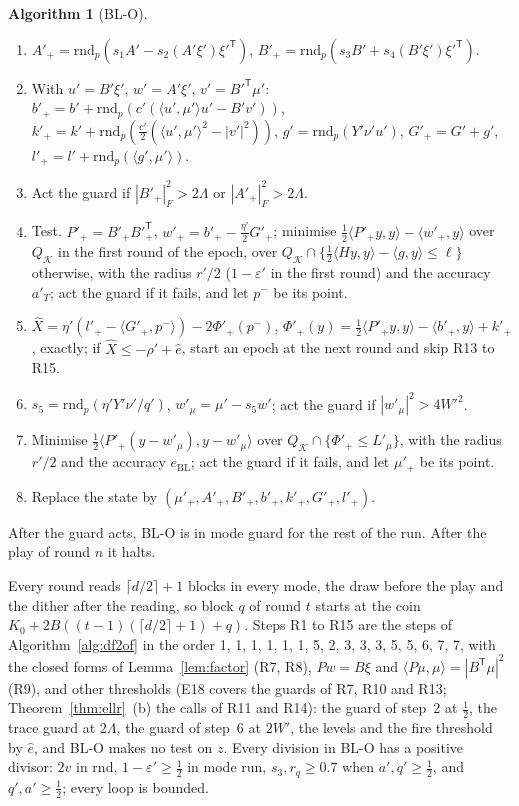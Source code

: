 \documentclass[11pt]{amsart}
\theoremstyle{definition}
\newtheorem{algorithm}[theorem]{Algorithm}
\numberwithin{equation}{section}
\newcommand{\cK}{\mathcal{K}}
\newcommand{\ip}[1]{\langle #1\rangle}
\begin{document}
\begin{algorithm}[BL-O]
\begin{center}
{\begin{minipage}{0.93\textwidth}
\begin{enumerate}[label=R\arabic*.,leftmargin=2.2em]
\item[R8.] $A'_+=\mathrm{rnd}_p(s_1A'-s_2(A'\xi')\xi'^{\mathsf T})$, $B'_+=\mathrm{rnd}_p(s_3B'+s_4(B'\xi')\xi'^{\mathsf T})$.
\item[R9.] With $u'=B'\xi'$, $w'=A'\xi'$, $v'=B'^{\mathsf T}\mu'$: $b'_+=b'+\mathrm{rnd}_p(c'(\ip{u',\mu'}u'-B'v'))$, $k'_+=k'+\mathrm{rnd}_p(\frac{c'}2(\ip{u',\mu'}^2-|v'|^2))$, $g'=\mathrm{rnd}_p(Y'\nu'u')$, $G'_+=G'+g'$, $l'_+=l'+\mathrm{rnd}_p(\ip{g',\mu'})$.
\item[R10.] Act the guard if $|B'_+|_F^2>2\Lambda$ or $|A'_+|_F^2>2\Lambda$.
\item[R11.] Test. $P'_+=B'_+B'^{\mathsf T}_+$, $w'_+=b'_+-\frac{\eta'}2G'_+$; minimise $\frac12\ip{P'_+y,y}-\ip{w'_+,y}$ over $Q_\cK$ in the first round of the epoch, over $Q_\cK\cap\{\frac12\ip{Hy,y}-\ip{g,y}\le\ell\}$ otherwise, with the radius $r'/2$ ($1-\varepsilon'$ in the first round) and the accuracy $a'_T$; act the guard if it fails, and let $p^-$ be its point.
\item[R12.] $\hat X=\eta'(l'_+-\ip{G'_+,p^-})-2\Phi'_+(p^-)$, $\Phi'_+(y)=\frac12\ip{P'_+y,y}-\ip{b'_+,y}+k'_+$, exactly; if $\hat X\le-\rho'+\hat e$, start an epoch at the next round and skip R13 to R15.
\item[R13.] $s_5=\mathrm{rnd}_p(\eta'Y'\nu'/q')$, $w'_\mu=\mu'-s_5w'$; act the guard if $|w'_\mu|^2>4W'^2$.
\item[R14.] Minimise $\frac12\ip{P'_+(y-w'_\mu),y-w'_\mu}$ over $Q_\cK\cap\{\Phi'_+\le L'_\mu\}$, with the radius $r'/2$ and the accuracy $e_{\mathrm{BL}}$; act the guard if it fails, and let $\mu'_+$ be its point.
\item[R15.] Replace the state by $(\mu'_+,A'_+,B'_+,b'_+,k'_+,G'_+,l'_+)$.
\end{enumerate}
After the guard acts, BL-O is in mode guard for the rest of the run. After the play of round $n$ it halts.
\end{minipage}}
\end{center}
\end{algorithm}

Every round reads $\lceil d/2\rceil+1$ blocks in every mode, the draw before the play and the dither after the reading, so block $q$ of round $t$ starts at the coin $K_0+2B((t-1)(\lceil d/2\rceil+1)+q)$. Steps R1 to R15 are the steps of Algorithm~\ref{alg:df2of} in the order 1, 1, 1, 1, 1, 1, 5, 2, 3, 3, 3, 5, 5, 6, 7, 7, with the closed forms of Lemma~\ref{lem:factor} (R7, R8), $Pw=B\xi$ and $\ip{P\mu,\mu}=|B^{\mathsf T}\mu|^2$ (R9), and other thresholds (E18 covers the guards of R7, R10 and R13; Theorem~\ref{thm:ellr}~(b) the calls of R11 and R14): the guard of step~2 at $\frac12$, the trace guard at $2\Lambda$, the guard of step~6 at $2W'$, the levels and the fire threshold by $\hat e$, and BL-O makes no test on $z$. Every division in BL-O has a positive divisor: $2v$ in $\mathrm{rnd}$, $1-\varepsilon'\ge\frac12$ in mode run, $s_3,r_q\ge0.7$ when $a',q'\ge\frac12$, and $q',a'\ge\frac12$; every loop is bounded.
\end{document}
